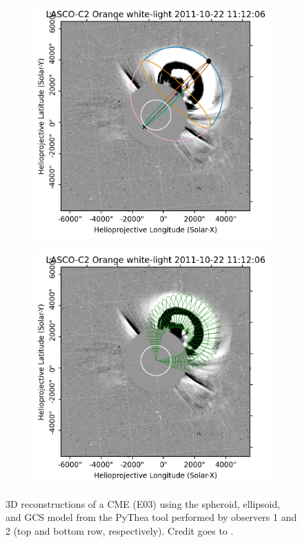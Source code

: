 \begin{figure}[htp]
\begin{subfigure}[b]{0.3\textwidth}
	\end{subfigure}
	\hfill
	\begin{subfigure}[b]{0.3\textwidth}
		\includegraphics[width=\textwidth]{chapter2/figs/Fig_e2.png}
	\end{subfigure}
	\hfill
	\begin{subfigure}[b]{0.3\textwidth}
		\includegraphics[width=\textwidth]{chapter2/figs/Fig_g2.png}
	\end{subfigure}
	\caption{3D reconstructions of a CME (E03) using the spheroid, ellipsoid, and GCS model from the PyThea tool performed by observers 1 and 2 (top and bottom row, respectively). Credit goes to \citet{miteva_2023}.}
	\label{fig_3D_fit}
\end{figure}

